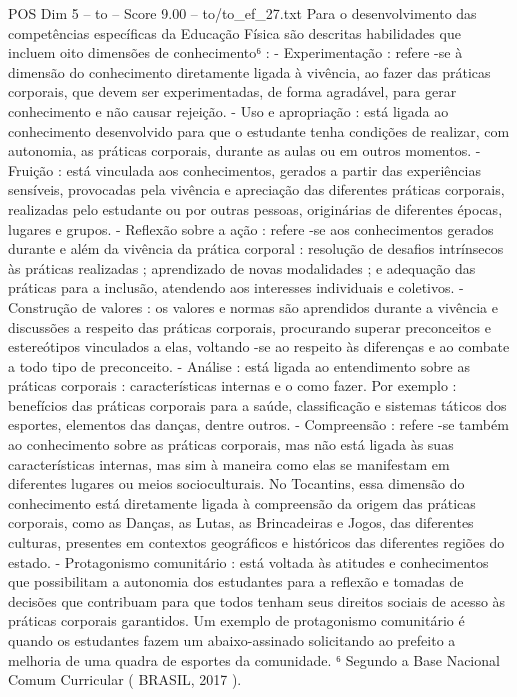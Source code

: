 \begin{textsample}{POS Dim 5 – to – Score 9.00 – to/to\_ef\_27.txt}
Para o desenvolvimento das competências específicas da Educação Física são descritas habilidades que incluem oito dimensões de conhecimento⁶ : - Experimentação : refere -se à dimensão do conhecimento diretamente ligada à vivência, ao fazer das práticas corporais, que devem ser experimentadas, de forma agradável, para gerar conhecimento e não causar rejeição. - Uso e apropriação : está ligada ao conhecimento desenvolvido para que o estudante tenha condições de realizar, com autonomia, as práticas corporais, durante as aulas ou em outros momentos. - Fruição : está vinculada aos conhecimentos, gerados a partir das experiências sensíveis, provocadas pela vivência e apreciação das diferentes práticas corporais, realizadas pelo estudante ou por outras pessoas, originárias de diferentes épocas, lugares e grupos. - Reflexão sobre a ação : refere -se aos conhecimentos gerados durante e além da vivência da prática corporal : resolução de desafios intrínsecos às práticas realizadas ; aprendizado de novas modalidades ; e adequação das práticas para a inclusão, atendendo aos interesses individuais e coletivos. - Construção de valores : os valores e normas são aprendidos durante a vivência e discussões a respeito das práticas corporais, procurando superar preconceitos e estereótipos vinculados a elas, voltando -se ao respeito às diferenças e ao combate a todo tipo de preconceito. - Análise : está ligada ao entendimento sobre as práticas corporais : características internas e o como fazer.
Por exemplo : benefícios das práticas corporais para a saúde, classificação e sistemas táticos dos esportes, elementos das danças, dentre outros. - Compreensão : refere -se também ao conhecimento sobre as práticas corporais, mas não está ligada às suas características internas, mas sim à maneira como elas se manifestam em diferentes lugares ou meios socioculturais.
No Tocantins, essa dimensão do conhecimento está diretamente ligada à compreensão da origem das práticas corporais, como as Danças, as Lutas, as Brincadeiras e Jogos, das diferentes culturas, presentes em contextos geográficos e históricos das diferentes regiões do estado. - Protagonismo comunitário : está voltada às atitudes e conhecimentos que possibilitam a autonomia dos estudantes para a reflexão e tomadas de decisões que contribuam para que todos tenham seus direitos sociais de acesso às práticas corporais garantidos.
Um exemplo de protagonismo comunitário é quando os estudantes fazem um abaixo-assinado solicitando ao prefeito a melhoria de uma quadra de esportes da comunidade. ⁶ Segundo a Base Nacional Comum Curricular ( BRASIL, 2017 ).

\end{textsample}
